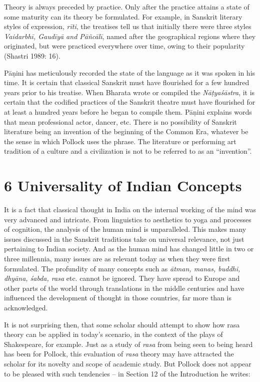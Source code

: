 Theory is always preceded by practice. Only after the practice attains a state of some maturity can its theory be formulated. For example, in Sanskrit literary styles of expression, \textit{rīti}, the treatises tell us that initially there were three styles \textit{Vaidarbhī, Gaudīyā and Pāñcālī}, named after the geographical regions where they originated, but were practiced everywhere over time, owing to their popularity (Shastri 1989: 16).

Pāṇini has meticulously recorded the state of the language as it was spoken in his time. It is certain that classical Sanskrit must have flourished for a few hundred years prior to his treatise. When Bharata wrote or compiled the \textit{Nāṭyaśāstra}, it is certain that the codified practices of the Sanskrit theatre must have flourished for at least a hundred years before he began to compile them. Pāṇini explains words that mean professional actor, dancer, etc. There is no possibility of Sanskrit literature being an invention of the beginning of the Common Era, whatever be the sense in which Pollock uses the phrase. The literature or performing art tradition of a culture and a civilization is not to be referred to as an “invention”.

\vspace{-.3cm}

\section*{6 Universality of Indian Concepts}

It is a fact that classical thought in India on the internal working of the mind was very advanced and intricate. From linguistics to aesthetics to yoga and processes of cognition, the analysis of the human mind is unparalleled. This makes many issues discussed in the Sanskrit traditions take on universal relevance, not just pertaining to Indian society. And as the human mind has changed little in two or three millennia, many issues are as relevant today as when they were first formulated. The profundity of many concepts such as \textit{ātman, manas, buddhi, dhyāna, śabda, rasa} etc. cannot be ignored. They have spread to Europe and other parts of the world through translations in the middle centuries and have influenced the development of thought in those countries, far more than is acknowledged.

It is not surprising then, that some scholar should attempt to show how rasa theory can be applied in today’s scenario, in the context of the plays of Shakespeare, for example. Just as a study of \textit{rasa} from being seen to being heard has been for Pollock, this evaluation of \textit{rasa} theory may have attracted the scholar for its novelty and scope of academic study. But Pollock does not appear to be pleased with such tendencies – in Section 12 of the Introduction he writes:

